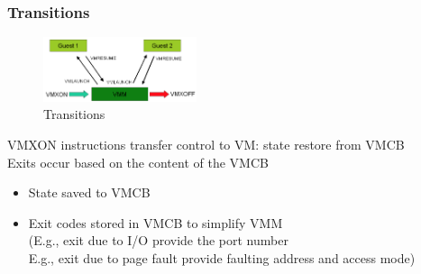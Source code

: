 \documentclass[10pt, oneside]{article}
\begin{document}
\subsubsection{Transitions}
\begin{figure}[H]
    \begin{center}
    \includegraphics[width=0.4\textwidth]{img/img49.png}
    \caption{Transitions}
    \label{fig:Transitions}
    \end{center}
\end{figure}
VMXON instructions transfer control to VM: state restore from VMCB\\
Exits occur based on the content of the VMCB\begin{itemize}
    \item State saved to VMCB
    \item Exit codes stored in VMCB to simplify VMM\\
    (E.g., exit due to I/O provide the port number\\
    E.g., exit due to page fault provide faulting address and access mode)
\end{itemize}

\end{document}
